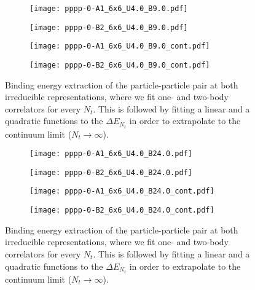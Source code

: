\begin{figure}
  \begin{subfigure}{.5\textwidth}
    \centering
    \texttt{[image: pppp-0-A1\_6x6\_U4.0\_B9.0.pdf]}
  \end{subfigure}%
  \begin{subfigure}{.5\textwidth}
    \centering
    \texttt{[image: pppp-0-B2\_6x6\_U4.0\_B9.0.pdf]}
  \end{subfigure}
  \begin{subfigure}{.5\textwidth}
      \centering
      \texttt{[image: pppp-0-A1\_6x6\_U4.0\_B9.0\_cont.pdf]}
  \end{subfigure}
  \begin{subfigure}{.5\textwidth}
      \centering
      \texttt{[image: pppp-0-B2\_6x6\_U4.0\_B9.0\_cont.pdf]}
  \end{subfigure}
  \caption{Binding energy extraction of the particle-particle pair at both irreducible representations, where we fit one- and two-body correlators for every $N_t$. This is followed by fitting a linear and a quadratic functions to the $\Delta E_{N_t}$ in order to extrapolate to the continuum limit ($N_t\to\infty$).}
  \label{fig:fig19}
\end{figure}

\begin{figure}
  \begin{subfigure}{.5\textwidth}
    \centering
    \texttt{[image: pppp-0-A1\_6x6\_U4.0\_B24.0.pdf]}
  \end{subfigure}%
  \begin{subfigure}{.5\textwidth}
    \centering
    \texttt{[image: pppp-0-B2\_6x6\_U4.0\_B24.0.pdf]}
  \end{subfigure}
  \begin{subfigure}{.5\textwidth}
      \centering
      \texttt{[image: pppp-0-A1\_6x6\_U4.0\_B24.0\_cont.pdf]}
  \end{subfigure}
  \begin{subfigure}{.5\textwidth}
      \centering
      \texttt{[image: pppp-0-B2\_6x6\_U4.0\_B24.0\_cont.pdf]}
  \end{subfigure}
  \caption{Binding energy extraction of the particle-particle pair at both irreducible representations, where we fit one- and two-body correlators for every $N_t$. This is followed by fitting a linear and a quadratic functions to the $\Delta E_{N_t}$ in order to extrapolate to the continuum limit ($N_t\to\infty$).}
  \label{fig:fig20}
\end{figure}

